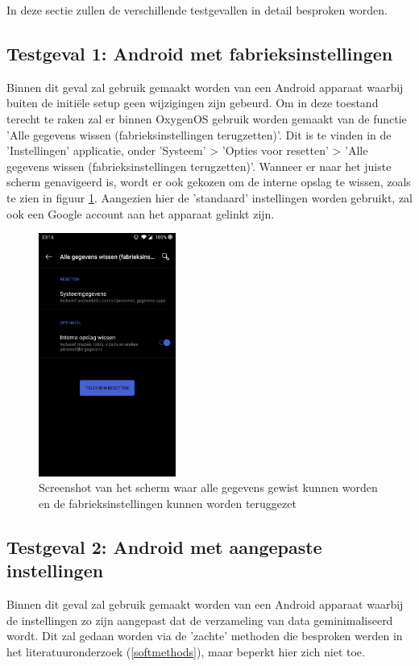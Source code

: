 In deze sectie zullen de verschillende testgevallen in detail besproken worden.

\subsection{Testgeval 1: Android met fabrieksinstellingen}
\label{sec:testgeval1}
Binnen dit geval zal gebruik gemaakt worden van een Android apparaat waarbij buiten de initiële setup geen wijzigingen zijn gebeurd. Om in deze toestand terecht te raken zal er binnen OxygenOS gebruik worden gemaakt van de functie 'Alle gegevens wissen (fabrieksinstellingen terugzetten)'. Dit is te vinden in de 'Instellingen' applicatie, onder 'Systeem' >  'Opties voor resetten' > 'Alle gegevens wissen (fabrieksinstellingen terugzetten)'. Wanneer er naar het juiste scherm genavigeerd is, wordt er ook gekozen om de interne opslag te wissen, zoals te zien in figuur \ref{fig:fabrieksinstellingen}. Aangezien hier de 'standaard' instellingen worden gebruikt, zal ook een Google account aan het apparaat gelinkt zijn.

\begin{figure}
    \centering
    \includegraphics[width=0.4\textwidth]{img/fabrieksinstellingen.jpg}
    \caption{Screenshot van het scherm waar alle gegevens gewist kunnen worden en de fabrieksinstellingen kunnen worden teruggezet}
    \label{fig:fabrieksinstellingen}
\end{figure}


\subsection{Testgeval 2: Android met aangepaste instellingen}
\label{sec:testgeval2}
Binnen dit geval zal gebruik gemaakt worden van een Android apparaat waarbij de instellingen zo zijn aangepast dat de verzameling van data geminimaliseerd wordt. Dit zal gedaan worden via de 'zachte' methoden die besproken werden in het literatuuronderzoek (\ref{softmethods}), maar beperkt hier zich niet toe.

